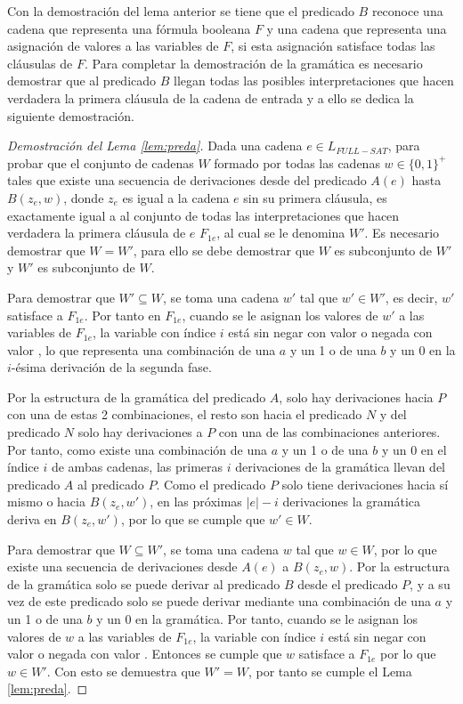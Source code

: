Con la demostración del lema anterior se tiene que el predicado $B$ reconoce una cadena que representa una fórmula booleana $F$
y una cadena que representa una asignación de valores a las variables de $F$, si esta asignación satisface
todas las cláusulas de $F$. Para completar la demostración de la gramática es necesario demostrar
que al predicado $B$ llegan todas las posibles interpretaciones que hacen verdadera la primera cláusula
de la cadena de entrada y a ello se dedica la siguiente demostración.

\begin{proof}[Demostración del Lema \ref{lem:preda}]
    Dada una cadena $e\in L_{FULL-SAT}$, para probar que el conjunto de cadenas $W$ formado por todas las cadenas 
    $w\in \{0,1\}^+$ tales que existe una secuencia de derivaciones desde del predicado $A(e)$ hasta 
    $B(z_e,w)$, donde $z_e$ es igual a la cadena $e$ sin su primera cláusula, es exactamente igual a 
    al conjunto de todas las interpretaciones que hacen verdadera la primera cláusula de $e$ $F_{1e}$, al cual se le denomina $W'$.
    Es necesario demostrar que $W=W'$, para ello se debe demostrar que $W$ es subconjunto de $W'$ y $W'$ es subconjunto de $W$. 
    
    Para demostrar que $W'\subseteq W$, se toma una cadena $w'$ tal que $w'\in W'$, es decir, $w'$ satisface a $F_{1e}$.  Por tanto en $F_{1e}$, cuando se le asignan los valores de $w'$ a las variables de $F_{1e}$, la variable  con índice $i$ está sin negar con valor \true{} o negada con valor \false{}, lo que representa una combinación de una $a$ y un 1 o de una $b$ y un 0 en la $i$-ésima derivación de la segunda fase.
    
    Por la estructura de la gramática del predicado $A$, solo hay derivaciones hacia $P$ con una de estas 2 combinaciones, el resto son hacia el predicado $N$ y del predicado $N$ solo hay derivaciones a $P$ con una de las combinaciones anteriores. Por tanto, como existe una combinación de una $a$ y un 1 o de una $b$ y un 0 en el índice $i$ de ambas cadenas, las primeras $i$ derivaciones de la gramática llevan del predicado $A$ al predicado $P$. Como el predicado $P$ solo tiene derivaciones hacia sí mismo o hacia $B(z_e,w')$, en las próximas $|e|-i$ derivaciones la gramática deriva en $B(z_e,w')$, por lo que se cumple que $w'\in W$.
    
    Para demostrar que $W\subseteq W'$, se toma una cadena $w$ tal que $w\in W$, por lo que existe una secuencia de derivaciones desde $A(e)$ a $B(z_e,w)$. Por la estructura de la gramática solo se puede derivar al predicado $B$ desde el predicado $P$, y a su vez de este predicado solo se puede derivar mediante una combinación de una $a$ y un 1 o de una $b$ y un 0 en la gramática. Por tanto, cuando se le asignan los valores de $w$ a las variables de $F_{1e}$, la variable con índice $i$ está sin negar con valor \true{} o negada con valor \false{}.  Entonces se cumple que $w$ satisface a $F_{1e}$ por lo que $w\in W'$. Con esto se demuestra que $W'=W$, por tanto se cumple el Lema \ref{lem:preda}.
\end{proof}

